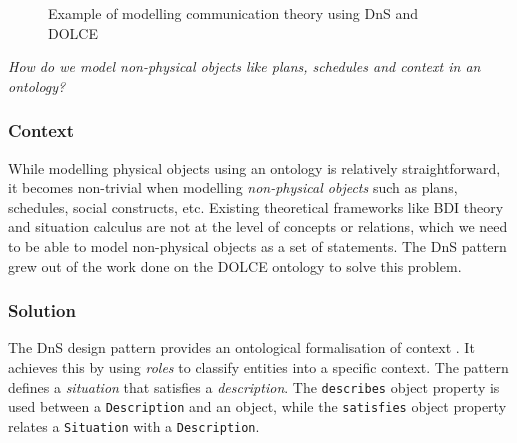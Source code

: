 \begin{figure}[bth]
	\caption{Example of modelling communication theory using \ac{DnS} and \ac{DOLCE}}
	\label{DnSExample}        
\end{figure}

\emph{How do we model non-physical objects like plans, schedules and context in an ontology?}

\subsubsection{Context}

While modelling physical objects using an ontology is relatively straightforward, it becomes non-trivial when modelling \emph{non-physical objects} \cite{Gangemi2003} such as plans, schedules, social constructs, etc. Existing theoretical frameworks like \ac{BDI} theory and situation calculus are not at the level of concepts or relations, which we need to be able to model non-physical objects as a set of statements. The \ac{DnS} pattern grew out of the work done on the \ac{DOLCE} ontology to solve this problem.



\subsubsection{Solution}

The \ac{DnS} design pattern provides an ontological formalisation of context \cite{Scherp2011}. It achieves this by using \emph{roles} to classify entities into a specific context. The pattern defines a \emph{situation} that satisfies a \emph{description}. The \texttt{describes} object property is used between a \texttt{Description} and an object, while the \texttt{satisfies} object property relates a \texttt{Situation} with a \texttt{Description}.

